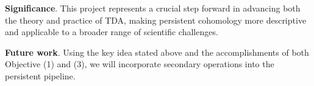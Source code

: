 \smallskip\textbf{Significance}.
This project represents a crucial step forward in advancing both the theory and practice of TDA, making persistent cohomology more descriptive and applicable to a broader range of scientific challenges.

\smallskip\textbf{Future work}.
Using the key idea stated above and the accomplishments of both Objective (1) and (3), we will incorporate secondary operations into the persistent pipeline.
